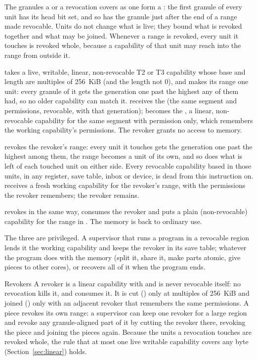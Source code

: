 The granules a  or a revocation covers as one form a : the first granule of
every unit has its head bit set, and so has the granule just after the end of a range 
made revocable. Units do not change what is live; they bound what is revoked together and what may be
joined. Whenever a range is revoked, every unit it touches is revoked whole, because a capability of
that unit may reach into the range from outside it.

\begin{description}[leftmargin=1em,style=nextline]
\item[\insref{cdom} \texttt{cd, cs}] takes a live, writable, linear, non-revocable T2 or T3 capability
  whose base and length are multiples of 256~KiB (and the length not 0), and makes its range one
  unit: every granule of it gets the generation one past the highest any of them had, so no older
  capability can match it.  receives the  (the same segment and
  permissions, revocable, with that generation);  becomes the , a linear,
  non-revocable capability for the same segment with permission  only, which remembers the
  working capability's permissions. The revoker grants no access to memory.
\item[\insref{crevoke} \texttt{cd, cs}] revokes the revoker's range: every unit it touches gets the
  generation one past the highest among them, the range becomes a unit of its own, and so does what
  is left of each touched unit on either side. Every revocable capability based in those units, in any
  register, save table, inbox or device, is dead from this instruction on.  receives a fresh
  working capability for the revoker's range, with the permissions the revoker remembers; the revoker
  remains.
\item[\insref{cundom} \texttt{cd, cs}] revokes in the same way, consumes the revoker and puts a plain
  (non-revocable) capability for the range in . The memory is back to ordinary use.
\end{description}

The three are privileged. A supervisor that runs a program in a revocable region lends it the working
capability and keeps the revoker in its save table; whatever the program does with the memory (split
it, share it, make parts atomic, give pieces to other cores),  or  recovers
all of it when the program ends.

\begin{rule*}{Revokers}
A revoker is a linear capability with  and is never revocable itself: no revocation kills it,
and  consumes it. It is cut () only at multiples of 256~KiB and joined
() only with an adjacent revoker that remembers the same permissions. A piece revokes its
own range: a supervisor can keep one revoker for a large region and revoke any granule-aligned part
of it by cutting the revoker there, revoking the piece and joining the pieces again. Because the
units a revocation touches are revoked whole, the rule that at most one live writable capability
covers any byte (Section~\ref{sec:linear}) holds.
\end{rule*}

